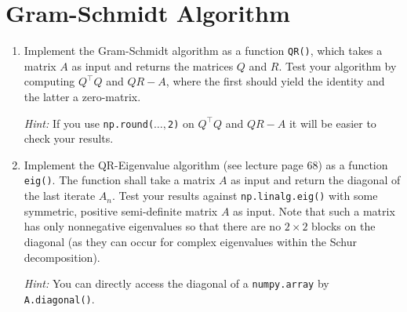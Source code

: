 \section{Gram-Schmidt Algorithm}
\begin{enumerate}
	\item 	Implement the Gram-Schmidt algorithm as a function \verb|QR()|, which takes a matrix $A$ as input and returns the matrices $Q$ and $R$.
	Test your algorithm by computing $Q^\top Q$ and $QR - A$, where the first should yield the identity and the latter a zero-matrix.
	
	\textit{Hint: } If you use \verb|np.round(|$\dots,$\verb|2)| on $Q^\top Q$ and $QR - A$ it will be easier to check your results.
	
	\item Implement the QR-Eigenvalue algorithm (see lecture page 68) as a function \verb|eig()|. The function shall take a matrix $A$ as input and return the diagonal of the last iterate $A_n$. Test your results against \verb|np.linalg.eig()| with some
	symmetric, positive semi-definite matrix $A$ as input. Note that such a matrix has only nonnegative eigenvalues so that there are no $2\times 2$ blocks on the diagonal (as they can occur for complex eigenvalues within the Schur decomposition).
	
	\textit{Hint: } You can directly access the diagonal of a \verb|numpy.array| by \verb|A.diagonal()|.
\end{enumerate}